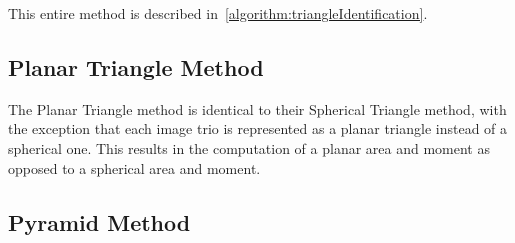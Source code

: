This entire method is described in~\autoref{algorithm:triangleIdentification}.

\subsection{Planar Triangle Method}\label{subsec:coleAndCrassidus'sPlanarTriangleMethod}
The Planar Triangle method is identical to their Spherical Triangle method, with the exception that each image
trio is represented as a planar triangle instead of a spherical one.
This results in the computation of a planar area and moment as opposed to a spherical area and moment.

\subsection{Pyramid Method}\label{subsec:pyramidMethod}
